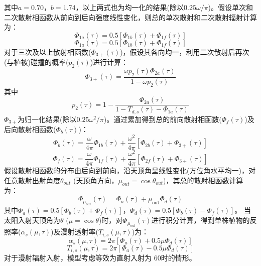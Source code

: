 其中$a=0.70$，$b=1.74$，以上两式也为均一化的结果(除以$0.25\omega/\pi$)。假设单次和二次散射相函数从前向到后向强度线性变化，则总的单次散射和二次散射辐射计算为：
\begin{equation}
\Phi_{1 a}(\tau)=0.5\left[\Phi_{1 b}(\tau)+\Phi_{1 f}(\tau)\right]
\end{equation}
\begin{equation}
\Phi_{1 a}(\tau)=0.5\left[\Phi_{1 b}(\tau)+\Phi_{1 f}(\tau)\right]
\end{equation}
对于三次及以上散射相函数($\Phi_{3+}\left(\tau\right)$)，假设其各向均一，利用二次散射后再次(与植被)碰撞的概率($p_2\left(\tau\right)$)进行计算：
\begin{equation}
\Phi_{3+}(\tau)=\frac{\omega p_{2}(\tau) \Phi_{2 a}(\tau)}{1-\omega p_{2}(\tau)}
\end{equation}
其中
\begin{equation}
p_{2}(\tau)=1-\frac{\Phi_{2 a}(\tau)}{1-T_{d, s}(\tau)-\Phi_{1 a}(\tau)}
\end{equation}
$\Phi_{3+}$为归一化结果(除以$0.25\omega^2/\pi$)。通过累加得到总的前向散射相函数($\Phi_f\left(\tau\right)$)及后向散射相函数($\Phi_b\left(\tau\right)$)：
\begin{equation}
\Phi_{b}(\tau)=\frac{\omega}{4 \pi} \Phi_{1 b}(\tau)+\frac{\omega^{2}}{4 \pi}\left[\Phi_{2 b}(\tau)+\Phi_{3+}(\tau)\right]
\end{equation}
\begin{equation}
\Phi_{f}(\tau)=\frac{\omega}{4 \pi} \Phi_{1 f}(\tau)+\frac{\omega^{2}}{4 \pi}\left[\Phi_{2 f}(\tau)+\Phi_{3+}(\tau)\right]
\end{equation}
假设散射相函数的分布由后向到前向，沿天顶角呈线性变化(方位角水平均一)，对任意散射出射角度$\theta_{out}$ (天顶角方向，$\mu_{out}=\cos{\theta_{out}}$)，其总的散射相函数计算为：
\begin{equation}
\Phi_{\mu_{\mathrm{out}}}(\tau)=\Phi_{a}(\tau)+\mu_{\mathrm{out}} \Phi_{d}(\tau)
\end{equation}
其中$\Phi_a\left(\tau\right)=0.5\left[\Phi_b\left(\tau\right)+\Phi_f\left(\tau\right)\right]$，$\Phi_d\left(\tau\right)=0.5\left[\Phi_b\left(\tau\right)-\Phi_f\left(\tau\right)\right]$。
当太阳入射天顶角为$\theta$ ($\mu=\cos{\theta}$)时，对$\Phi_{\mu_{out}}\left(\tau\right)$进行积分计算，得到单株植物的反照率($\alpha_s\left(\mu,\tau\right)$)及漫射透射率($T_{i,s}\left(\mu,\tau\right)$)为：
\begin{equation}
\alpha_{s}(\mu, \tau)=2 \pi\left[\Phi_{a}(\tau)+0.5 \mu \Phi_{d}(\tau)\right]
\end{equation}
\begin{equation}
T_{i, s}(\mu, \tau)=2 \pi\left[\Phi_{a}(\tau)-0.5 \mu \Phi_{d}(\tau)\right]
\end{equation}
对于漫射辐射入射，模型考虑等效为直射入射为 60\textdegree 时的情形。



